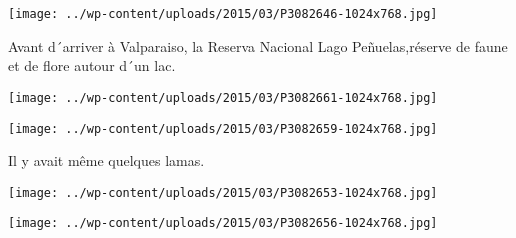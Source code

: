  

\begin{center} \texttt{[image: ../wp-content/uploads/2015/03/P3082646-1024x768.jpg]} \end{center}

Avant d´arriver à Valparaiso, la Reserva Nacional Lago Peñuelas,réserve de faune et de flore autour d´un lac. 

\begin{center} \texttt{[image: ../wp-content/uploads/2015/03/P3082661-1024x768.jpg]} \end{center}

 

\begin{center} \texttt{[image: ../wp-content/uploads/2015/03/P3082659-1024x768.jpg]} \end{center}

 Il y avait même quelques lamas. 

\begin{center} \texttt{[image: ../wp-content/uploads/2015/03/P3082653-1024x768.jpg]} \end{center}

 

\begin{center} \texttt{[image: ../wp-content/uploads/2015/03/P3082656-1024x768.jpg]} \end{center}




 
 
